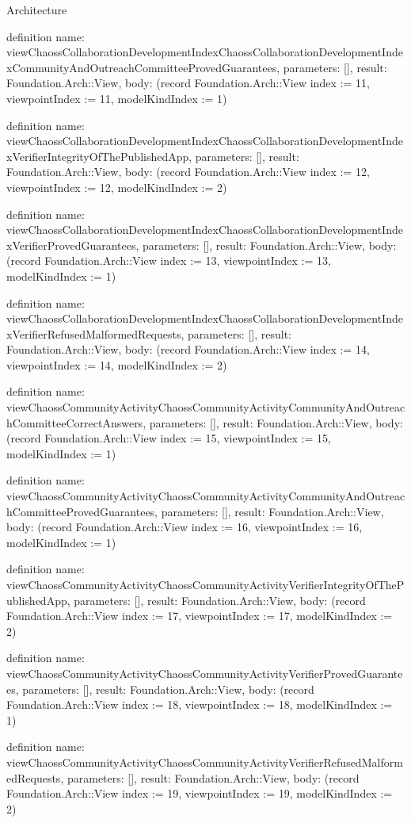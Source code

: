 \begin{lexlean}{Architecture}
\begin{semanticmodule}
definition{
  name: viewChaossCollaborationDevelopmentIndexChaossCollaborationDevelopmentIndexCommunityAndOutreachCommitteeProvedGuarantees,
  parameters: [],
  result: Foundation.Arch::View,
  body: (record Foundation.Arch::View {index := 11, viewpointIndex := 11, modelKindIndex := 1})
}

definition{
  name: viewChaossCollaborationDevelopmentIndexChaossCollaborationDevelopmentIndexVerifierIntegrityOfThePublishedApp,
  parameters: [],
  result: Foundation.Arch::View,
  body: (record Foundation.Arch::View {index := 12, viewpointIndex := 12, modelKindIndex := 2})
}

definition{
  name: viewChaossCollaborationDevelopmentIndexChaossCollaborationDevelopmentIndexVerifierProvedGuarantees,
  parameters: [],
  result: Foundation.Arch::View,
  body: (record Foundation.Arch::View {index := 13, viewpointIndex := 13, modelKindIndex := 1})
}

definition{
  name: viewChaossCollaborationDevelopmentIndexChaossCollaborationDevelopmentIndexVerifierRefusedMalformedRequests,
  parameters: [],
  result: Foundation.Arch::View,
  body: (record Foundation.Arch::View {index := 14, viewpointIndex := 14, modelKindIndex := 2})
}

definition{
  name: viewChaossCommunityActivityChaossCommunityActivityCommunityAndOutreachCommitteeCorrectAnswers,
  parameters: [],
  result: Foundation.Arch::View,
  body: (record Foundation.Arch::View {index := 15, viewpointIndex := 15, modelKindIndex := 1})
}

definition{
  name: viewChaossCommunityActivityChaossCommunityActivityCommunityAndOutreachCommitteeProvedGuarantees,
  parameters: [],
  result: Foundation.Arch::View,
  body: (record Foundation.Arch::View {index := 16, viewpointIndex := 16, modelKindIndex := 1})
}

definition{
  name: viewChaossCommunityActivityChaossCommunityActivityVerifierIntegrityOfThePublishedApp,
  parameters: [],
  result: Foundation.Arch::View,
  body: (record Foundation.Arch::View {index := 17, viewpointIndex := 17, modelKindIndex := 2})
}

definition{
  name: viewChaossCommunityActivityChaossCommunityActivityVerifierProvedGuarantees,
  parameters: [],
  result: Foundation.Arch::View,
  body: (record Foundation.Arch::View {index := 18, viewpointIndex := 18, modelKindIndex := 1})
}

definition{
  name: viewChaossCommunityActivityChaossCommunityActivityVerifierRefusedMalformedRequests,
  parameters: [],
  result: Foundation.Arch::View,
  body: (record Foundation.Arch::View {index := 19, viewpointIndex := 19, modelKindIndex := 2})
}


\end{semanticmodule}
\end{lexlean}
